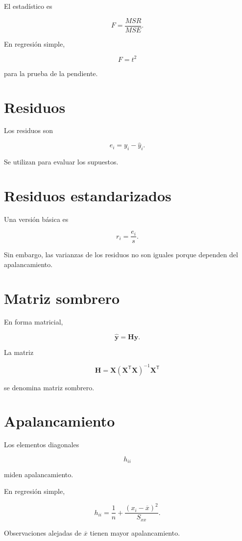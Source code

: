 \documentclass[
  spanish,
  11pt,
  letterpaper,
  DIV=11,
  numbers=noendperiod]{scrreprt}
\theoremstyle{definition}
\theoremstyle{plain}
\theoremstyle{definition}
\theoremstyle{remark}
\begin{document}
El estadístico es

\[
F
=
\frac{
MSR
}{
MSE
}.
\]

En regresión simple,

\[
F=t^2
\]

para la prueba de la pendiente.

\section{Residuos}\label{residuos}

Los residuos son

\[
e_i
=
y_i-\widehat{y}_i.
\]

Se utilizan para evaluar los supuestos.

\section{Residuos estandarizados}\label{residuos-estandarizados}

Una versión básica es

\[
r_i
=
\frac{e_i}{s}.
\]

Sin embargo, las varianzas de los residuos no son iguales porque
dependen del apalancamiento.

\section{Matriz sombrero}\label{matriz-sombrero}

En forma matricial,

\[
\widehat{\mathbf{y}}
=
\mathbf{H}\mathbf{y}.
\]

La matriz

\[
\mathbf{H}
=
\mathbf{X}
(
\mathbf{X}^{\mathsf T}\mathbf{X}
)^{-1}
\mathbf{X}^{\mathsf T}
\]

se denomina matriz sombrero.

\section{Apalancamiento}\label{apalancamiento}

Los elementos diagonales

\[
h_{ii}
\]

miden apalancamiento.

En regresión simple,

\[
h_{ii}
=
\frac{1}{n}
+
\frac{
(x_i-\overline{x})^2
}{
S_{xx}
}.
\]

Observaciones alejadas de \(\overline{x}\) tienen mayor apalancamiento.
\end{document}
